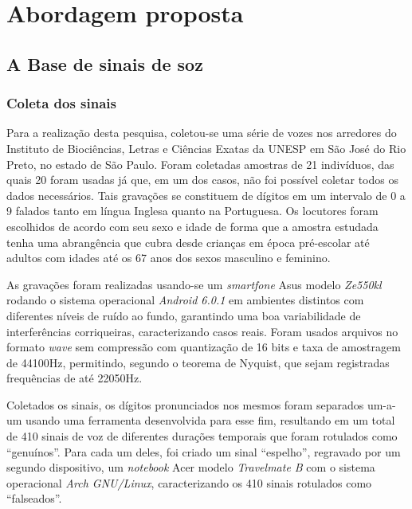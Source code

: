 \chapter{Abordagem proposta} \label{chap:propApproach}
	\section{A Base de sinais de soz}
	    \subsection{Coleta dos sinais}
		\par Para a realização desta pesquisa, coletou-se uma série de vozes nos arredores do Instituto de Biociências, Letras e Ciências Exatas da UNESP em São José do Rio Preto, no estado de São Paulo. Foram coletadas amostras de 21 indivíduos, das quais 20 foram usadas já que, em um dos casos, não foi possível coletar todos os dados necessários. Tais gravações se constituem de dígitos em um intervalo de 0 a 9 falados tanto em língua Inglesa quanto na Portuguesa. Os locutores foram escolhidos de acordo com seu sexo e idade de forma que a amostra estudada tenha uma abrangência que cubra desde crianças em época pré-escolar até adultos com idades até os 67 anos dos sexos masculino e feminino.\\
					
		\par As gravações foram realizadas usando-se um \textit{smartfone} Asus modelo \textit{Ze550kl} rodando o sistema operacional \textit{Android 6.0.1} em ambientes distintos com diferentes níveis de ruído ao fundo, garantindo uma boa variabilidade de interferências corriqueiras, caracterizando casos reais. Foram usados arquivos no formato \textit{wave} sem compressão com quantização de 16 bits e taxa de amostragem de 44100Hz, permitindo, segundo o teorema de Nyquist, que sejam registradas frequências de até 22050Hz.\\
		
		\par Coletados os sinais, os dígitos pronunciados nos mesmos foram separados um-a-um usando uma ferramenta desenvolvida para esse fim, resultando em um total de 410 sinais de voz de diferentes durações temporais que foram rotulados como ``genuínos''. Para cada um deles, foi criado um sinal ``espelho'',  regravado por um segundo dispositivo, um \textit{notebook} Acer modelo  \textit{Travelmate B} com o sistema operacional \textit{Arch GNU/Linux}, caracterizando os 410 sinais rotulados como ``falseados''.

